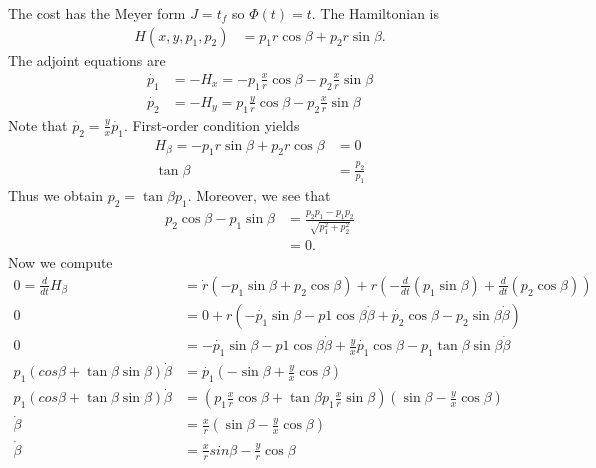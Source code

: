 \documentclass[12pt]{article}
\begin{document}
\begin{problem}[5]
The cost has the Meyer form $ J = t_f$ so  $ \Phi(t) = t$. The Hamiltonian is
\begin{align*}
	H(x,y,p_1,p_2) &= p_1 r \cos \beta + p_2 r \sin \beta .
\end{align*}
The adjoint equations are
\begin{align*}
	\dot{p_1} &= -H_x = - p_1 \frac{x}{r} \cos \beta - p_2 \frac{x}{r} \sin \beta \\
	\dot{p_2} &= -H_y = p_1 \frac{y}{r} \cos \beta - p_2 \frac{x}{r} \sin \beta 
\end{align*}
Note that $ \dot{p_2} = \frac{y}{x} \dot{p_1}$. First-order condition yields
\begin{align*}
	H_{\beta} = -p_1 r \sin \beta + p_2 r \cos \beta &= 0 \\
	\tan \beta &= \frac{p_2}{p_1} 
\end{align*}
Thus we obtain $ p_2 = \tan \beta p_1$. Moreover, we see that
\begin{align*}
	p_2 \cos \beta - p_1 \sin \beta &= \frac{p_2p_1 - p_1 p_2}{ \sqrt{p_1^2+p_2^2} } \\
	&= 0 .
\end{align*}
Now we compute
\begin{align*}
	0=\frac{d}{dt} H_{ \beta} &= \dot{r} (-p_1 \sin \beta + p_2 \cos \beta) + r\left( -\frac{d}{dt}(p_1 \sin \beta) + \frac{d}{dt}(p_2 \cos \beta) \right)  \\
				0&=0 + r \left( -\dot{p_1} \sin \beta - p1 \cos \beta \dot{\beta} + \dot{p_2} \cos \beta - p_2 \sin \beta \dot{\beta} \right)   \\
				0&= -\dot{p_1} \sin \beta - p1 \cos \beta \dot{\beta} + \frac{y}{x} \dot{p_1} \cos \beta - p_1\tan \beta \sin \beta \dot{\beta} \\
				p_1 (cos \beta + \tan \beta \sin \beta) \dot{ \beta} &= \dot{p_1} \left( - \sin \beta + \frac{y}{x} \cos \beta \right)  \\
				p_1 (cos \beta + \tan \beta \sin \beta) \dot{ \beta} &= \left( p_1 \frac{x}{r} \cos \beta + \tan \beta p_1 \frac{x}{r} \sin \beta \right)  \left( \sin \beta - \frac{y}{x} \cos \beta \right)  \\
				\dot{\beta}&= \frac{x}{r} \left( \sin \beta - \frac{y}{x} \cos \beta \right)  \\
				\dot{\beta} &=  \frac{x}{r} sin \beta - \frac{y}{r} \cos \beta
\end{align*}
\end{problem}
\end{document}
